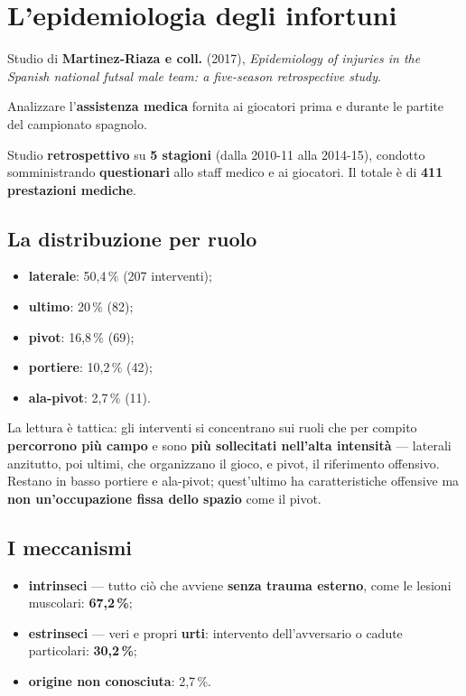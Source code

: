 \section{L'epidemiologia degli infortuni}

Studio di \textbf{Martinez-Riaza e coll.} (2017), \textit{Epidemiology of injuries in the Spanish
national futsal male team: a five-season retrospective study}.

Analizzare l'\textbf{assistenza medica} fornita ai giocatori prima e durante le partite del
campionato spagnolo.

Studio \textbf{retrospettivo} su \textbf{5 stagioni} (dalla 2010-11 alla 2014-15), condotto
somministrando \textbf{questionari} allo staff medico e ai giocatori. Il totale è di
\textbf{411 prestazioni mediche}.

\subsection{La distribuzione per ruolo}

\begin{itemize}
  \item \textbf{laterale}: 50,4\,\% (207 interventi);
  \item \textbf{ultimo}: 20\,\% (82);
  \item \textbf{pivot}: 16,8\,\% (69);
  \item \textbf{portiere}: 10,2\,\% (42);
  \item \textbf{ala-pivot}: 2,7\,\% (11).
\end{itemize}

La lettura è tattica: gli interventi si concentrano sui ruoli che per compito
\textbf{percorrono più campo} e sono \textbf{più sollecitati nell'alta intensità} --- laterali
anzitutto, poi ultimi, che organizzano il gioco, e pivot, il riferimento offensivo. Restano in
basso portiere e ala-pivot; quest'ultimo ha caratteristiche offensive ma \textbf{non un'occupazione
fissa dello spazio} come il pivot.

\subsection{I meccanismi}

\begin{itemize}
  \item \textbf{intrinseci} --- tutto ciò che avviene \textbf{senza trauma esterno}, come le
    lesioni muscolari: \textbf{67,2\,\%};
  \item \textbf{estrinseci} --- veri e propri \textbf{urti}: intervento dell'avversario o cadute
    particolari: \textbf{30,2\,\%};
  \item \textbf{origine non conosciuta}: 2,7\,\%.
\end{itemize}

